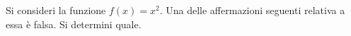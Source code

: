Si consideri la funzione $f(x)=x^2$. %
Una delle affermazioni seguenti relativa a essa è falsa. Si determini quale.
